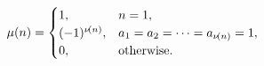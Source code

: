 \[\mathop{\mu\/}\nolimits\!\left(n\right)=\begin{cases}1,&n=1,\\
(-1)^{\mathop{\nu\/}\nolimits\!\left(n\right)},&a_{1}=a_{2}=\dots=a_{\mathop{%
\nu\/}\nolimits\!\left(n\right)}=1,\\
0,&\mbox{otherwise}.\end{cases}\]
